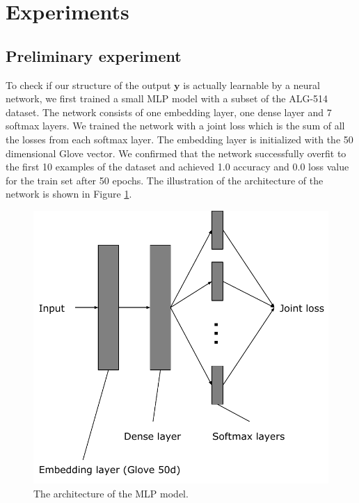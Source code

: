 \documentclass[11pt,letterpaper]{article}
\begin{document}
\section{Experiments}
\subsection{Preliminary experiment}
To check if our structure of the output $\mathbf{y}$ is actually learnable by a neural network, we first trained a small MLP model with a subset of the ALG-514 dataset. The network consists of one embedding layer, one dense layer and 7 softmax layers. We trained the network with a joint loss which is the sum of all the losses from each softmax layer. The embedding layer is initialized with the 50 dimensional Glove vector. We confirmed that the network successfully overfit to the first 10 examples of the dataset and achieved 1.0 accuracy and 0.0 loss value for the train set after 50 epochs. The illustration of the architecture of the network is shown in Figure \ref{mlp}.
\begin{figure}[ht]
	\centering
	\includegraphics[bb=0 0 361 341, scale=0.5]{mlp.pdf}
    \caption{The architecture of the MLP model.}
    \label{mlp}
\end{figure}
%
\end{document}
